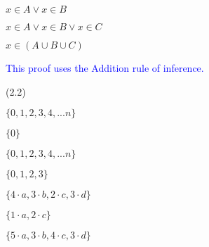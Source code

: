 \documentclass{exam}
\begin{document}
\begin{questions}
\begin{subparts}
\begin{center}
\(x \in A \lor x \in B \)

\(x \in A \lor x \in B \lor x \in C\)

\(x \in (A \cup B \cup C) \)

\textcolor{blue}{This proof uses the Addition rule of inference.}

\end{center}

\end{subparts}

 (2.2)
\begin{subparts}

\begin{center}
\( \{0,1,2,3,4,...n\} \)
\end{center}


\begin{center}
\( \{0\} \)
\end{center}


\begin{center}
\( \{0,1,2,3,4,...n\} \)
\end{center}


\begin{center}
\( \{0,1,2,3\} \)
\end{center}

\end{subparts}

\begin{subparts}

\begin{center}
\( \{4 \cdot a, 3 \cdot b, 2 \cdot c, 3 \cdot d\} \)
\end{center}


\begin{center}
\( \{1 \cdot a, 2 \cdot c\} \)
\end{center}


\begin{center}
\( \{5 \cdot a, 3 \cdot b, 4 \cdot c, 3 \cdot d\} \)
\end{center}


\end{subparts}
\end{questions}
\end{document}
